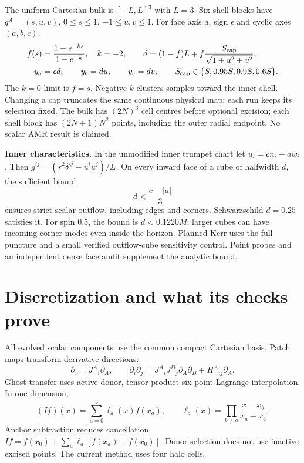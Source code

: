 \documentclass[11pt,letterpaper]{article}
\begin{document}
The uniform Cartesian bulk is $[-L,L]^3$ with $L=3$. Six shell blocks have $q^A=(s,u,v)$, $0\leq s\leq1$, $-1\leq u,v\leq1$. For face axis $a$, sign $\epsilon$ and cyclic axes $(a,b,c)$,
\begin{align}
 f(s)&=\frac{1-e^{-k s}}{1-e^{-k}},\quad k=-2,\qquad
 d=(1-f)L+f\frac{S_{\rm cap}}{\sqrt{1+u^2+v^2}},\\
 y_a&=\epsilon d,\qquad y_b=du,\qquad y_c=dv,\qquad S_{\rm cap}\in\{S,0.95S,0.9S,0.6S\}.
\end{align}
The $k=0$ limit is $f=s$. Negative $k$ clusters samples toward the inner shell. Changing a cap truncates the same continuous physical map; each run keeps its selection fixed. The bulk has $(2N)^3$ cell centres before optional excision; each shell block has $(2N+1)N^2$ points, including the outer radial endpoint. No scalar AMR result is claimed.

\textbf{Inner characteristics.} In the unmodified inner trumpet chart let $u_i=cn_i-aw_i$. Then $g^{ij}=(r^2\delta^{ij}-u^iu^j)/\Sigma$. On every inward face of a cube of halfwidth $d$, the sufficient bound
\begin{equation}
 d<\frac{c-|a|}{3}
\end{equation}
ensures strict scalar outflow, including edges and corners. Schwarzschild $d=0.25$ satisfies it. For spin $0.5$, the bound is $d<0.1220M$; larger cubes can have incoming corner modes even inside the horizon. Planned Kerr uses the full puncture and a small verified outflow-cube sensitivity control. Point probes and an independent dense face audit supplement the analytic bound.

\clearpage
\section{Discretization and what its checks prove}
All evolved scalar components use the common compact Cartesian basis. Patch maps transform derivative directions:
\begin{equation}
 \partial_i=J^A{}_i\partial_A,\qquad
 \partial_i\partial_j=J^A{}_iJ^B{}_j\partial_A\partial_B+H^A{}_{ij}\partial_A.
\end{equation}
Ghost transfer uses active-donor, tensor-product six-point Lagrange interpolation. In one dimension,
\begin{equation}
 (If)(x)=\sum_{a=0}^{5}\ell_a(x)f(x_a),\qquad
 \ell_a(x)=\prod_{b\ne a}\frac{x-x_b}{x_a-x_b}.
\end{equation}
Anchor subtraction reduces cancellation, $If=f(x_0)+\sum_a\ell_a[f(x_a)-f(x_0)]$. Donor selection does not use inactive excised points. The current method uses four halo cells.
\end{document}
